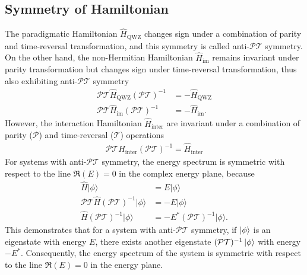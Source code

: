 \documentclass[longbibliography, aps, prx, amsmath, amssymb, amsfonts, twocolumn,superscriptaddress, footinbib]{revtex4-1}
\begin{document}
	\subsection{Symmetry of Hamiltonian~\label{sec:symmetry_Hamiltonian}}
	The paradigmatic Hamiltonian $\hat{H}_{\text{QWZ}}$ changes sign under a combination of parity and time-reversal transformation, and this symmetry is called anti-$\mathcal{PT}$ symmetry.
	On the other hand, the non-Hermitian Hamiltonian $\hat{H}_{\text{im}}$ remains invariant under parity transformation but changes sign under time-reversal transformation, thus also exhibiting anti-$\mathcal{PT}$ symmetry
	\begin{equation}
		\begin{split}
			\mathcal{PT} \hat{H}_{\text{QWZ}} (\mathcal{PT})^{-1} &= -\hat{H}_{\text{QWZ}} \\
			\mathcal{PT} \hat{H}_{\text{im}} (\mathcal{PT})^{-1} &= -\hat{H}_{\text{im}}.
		\end{split}
	\end{equation}
	However, the interaction Hamiltonian $\hat{H}_{\text{inter}}$ are invariant under a combination of parity ($\mathcal{P}$) and time-reversal ($\mathcal{T}$) operations
	\begin{equation}
		\begin{split}
			\mathcal{PT} \hat{H}_{\text{inter}} (\mathcal{PT})^{-1} = \hat{H}_{\text{inter}}%
		\end{split}
	\end{equation}
	For systems with anti-$\mathcal{PT}$ symmetry, the energy spectrum is symmetric with respect to the line $\Re(E)=0$ in the complex energy plane, because
	\begin{equation}
		\begin{split}
			\hat{H} \vert \phi \rangle &= E \vert \phi \rangle\\
			\mathcal{PT} \hat{H} (\mathcal{PT})^{-1} \vert \phi \rangle &= - E \vert \phi \rangle\\
			\hat{H} (\mathcal{PT})^{-1} \vert \phi \rangle &= - E^* (\mathcal{PT})^{-1} \vert \phi \rangle.
		\end{split}
	\end{equation}
	This demonstrates that for a system with anti-$\mathcal{PT}$ symmetry, if $\ket{\phi}$ is an eigenstate with energy $E$, there exists another eigenstate $(\mathcal{PT})^{-1} \ket{\phi}$ with energy $-E^*$. Consequently, the energy spectrum of the system is symmetric with respect to the line $\Re(E)=0$ in the energy plane.
\end{document}
